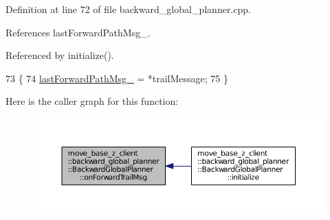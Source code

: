 Definition at line 72 of file backward\+\_\+global\+\_\+planner.\+cpp.



References last\+Forward\+Path\+Msg\+\_\+.



Referenced by initialize().


\begin{DoxyCode}
73 \{
74     \hyperlink{classmove__base__z__client_1_1backward__global__planner_1_1BackwardGlobalPlanner_a058da13b9ee6b1d878830503e67de638}{lastForwardPathMsg\_} = *trailMessage;
75 \}
\end{DoxyCode}


Here is the caller graph for this function\+:
\nopagebreak
\begin{figure}[H]
\begin{center}
\leavevmode
\includegraphics[width=350pt]{classmove__base__z__client_1_1backward__global__planner_1_1BackwardGlobalPlanner_a21ba5e6dbe063eb3ea1a34d8cccf90a3_icgraph}
\end{center}
\end{figure}


